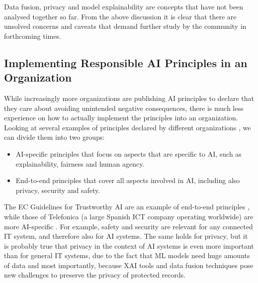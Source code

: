 \documentclass[final]{elsarticle}
\begin{document}
Data fusion, privacy and model explainability are concepts that have not been analysed together so far. From the above discussion it is clear that there are unsolved concerns and caveats that demand further study by the community in forthcoming times. 

\subsection{Implementing Responsible AI Principles in an Organization}

While increasingly more organizations are publishing AI principles to declare that they care about avoiding unintended negative consequences, there is much less experience on how to actually implement the principles into an organization. Looking at several examples of principles declared by different organizations \cite{fjeld2019principled}, we can divide them into two groups:
\begin{itemize}[leftmargin=*]
\item AI-specific principles that focus on aspects that are specific to AI, such as explainability, fairness and human agency.
\item End-to-end principles that cover all aspects involved in AI, including also privacy, security and safety. 
\end{itemize}

The EC Guidelines for Trustworthy AI are an example of end-to-end principles \cite{hleg2019high}, while those of Telefonica (a large Spanish ICT company operating worldwide) are more AI-specific \cite{benjamins2019responsible}. For example, safety and security are relevant for any connected IT system, and therefore also for AI systems. The same holds for privacy, but it is probably true that privacy in the context of AI systems is even more important than for general IT systems, due to the fact that ML models need huge amounts of data and most importantly, because XAI tools and data fusion techniques pose new challenges to preserve the privacy of protected records. 
\end{document}
